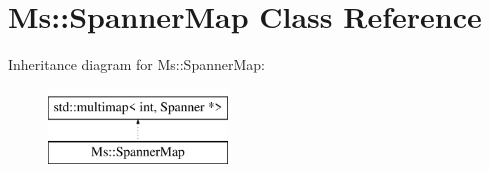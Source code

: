\hypertarget{class_ms_1_1_spanner_map}{}\section{Ms\+:\+:Spanner\+Map Class Reference}
\label{class_ms_1_1_spanner_map}
Inheritance diagram for Ms\+:\+:Spanner\+Map\+:\begin{figure}[H]
\begin{center}
\leavevmode
\includegraphics[height=2.000000cm]{class_ms_1_1_spanner_map}
\end{center}
\end{figure}
